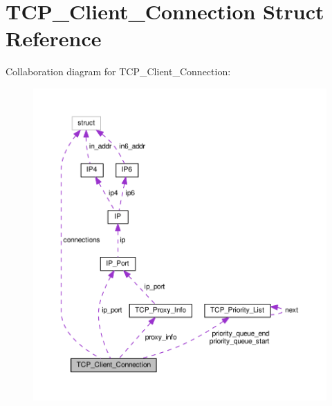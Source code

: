 \hypertarget{struct_t_c_p___client___connection}{\section{T\+C\+P\+\_\+\+Client\+\_\+\+Connection Struct Reference}
\label{struct_t_c_p___client___connection}
}


Collaboration diagram for T\+C\+P\+\_\+\+Client\+\_\+\+Connection\+:\nopagebreak
\begin{figure}[H]
\begin{center}
\leavevmode
\includegraphics[width=350pt]{struct_t_c_p___client___connection__coll__graph}
\end{center}
\end{figure}
